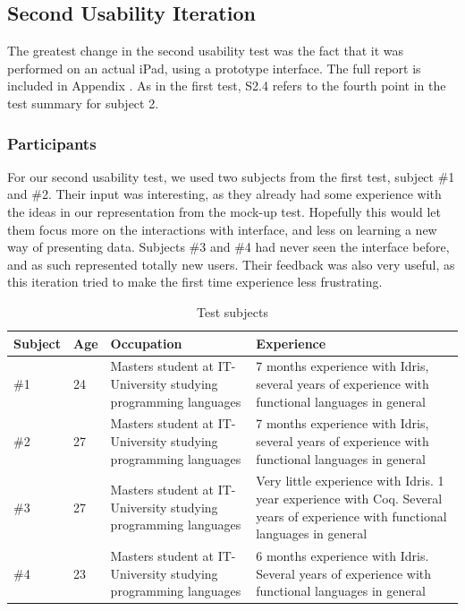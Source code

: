 \subsection{Second Usability Iteration}
\label{sec:SecondUsabilityTest}
The greatest change in the second usability test was the fact that it was
performed on an actual iPad, using a prototype interface. The full report is
included in Appendix . As in the first test, S2.4 refers to
the fourth point in the test summary for subject 2.

\subsubsection{Participants}
For our second usability test, we used two subjects from the first test,
subject \#1 and \#2. Their input was interesting, as they already had some
experience with the ideas in our representation from the mock-up test.
Hopefully this would let them focus more on the interactions with interface,
and less on learning a new way of presenting data. Subjects \#3 and \#4 had
never seen the interface before, and as such represented totally new users.
Their feedback was also very useful, as this iteration tried to make the first
time experience less frustrating.

\begin{table}[h]
\centering
\begin{tabular}{| l | l | p{5cm} | p{5cm} |}
\hline
Subject & Age & Occupation & Experience \\ \hline
\#1 & 24 & Masters student at IT-University studying programming languages & 7 months experience with Idris, several years of experience with functional languages in general \\ \hline
\#2 & 27 & Masters student at IT-University studying programming languages & 7 months experience with Idris, several years of experience with functional languages in general \\ \hline
\#3 & 27 & Masters student at IT-University studying programming languages & Very little experience with Idris. 1 year experience with Coq. Several years of experience with functional languages in general \\ \hline
\#4 & 23 & Masters student at IT-University studying programming languages & 6 months experience with Idris. Several years of experience with functional languages in general \\ \hline
\end{tabular}
\caption{Test subjects}
\label{table:second_test_subjects}
\end{table}

